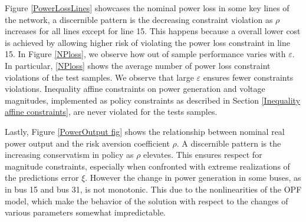 \documentclass[11pt,a4paper,oneside,openany]{book}
\numberwithin{definition}{section}
\numberwithin{theorem}{section}
\numberwithin{problem}{section}
\begin{document}
\noindent
Figure \ref{PowerLossLines} showcases the nominal power loss in some key lines of the network, a discernible pattern is the decreasing constraint violation as \(\rho\) increases for all lines except for line 15. This happens because a overall lower cost is achieved by allowing higher risk of violating the power loss constraint in line 15.  In Figure \ref{NPloss}, we observe how out of sample performance varies with $\varepsilon$. In particular, \ref{NPloss} shows the average number of power loss constraint violations of the test samples. We observe that large $\varepsilon$ ensures fewer constraints violations. Inequality affine constraints on power generation and voltage magnitudes, implemented as policy constraints as described in Section \ref{Inequality affine constraints}, are never violated for the tests samples. 


Lastly,  Figure \ref{PowerOutput fig}  shows  the relationship between nominal real power output and the risk aversion coefficient \(\rho\). A discernible pattern is the increasing conservatism in policy as \(\rho\) elevates. This ensures respect for magnitude constraints, especially when confronted with extreme realizations of the predictions error \(\xi\). However the change in power generation in some buses, as in bus 15 and bus 31, is not monotonic. This due to the nonlinearities of the OPF model, which make the behavior of the solution with respect to the changes of various parameters somewhat impredictable.
 




\end{document}
